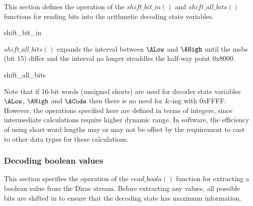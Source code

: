\label{arithshiftin}

This section defines the operation of the $shift\_bit\_in()$ 
and $shift\_all\_bits()$ functions
for reading bits into the arithmetic decoding state variables.

\begin{pseudo}{shift\_bit\_in}{}
\end{pseudo}

$shift\_all\_bits()$ expands the interval between $\ALow$ and $\AHigh$
until the msbs (bit 15) differ and the interval no longer
straddles the half-way point 0x8000.

\begin{pseudo}{shift\_all\_bits}{}
\bsEND
{}
\bsEND
\end{pseudo}

\begin{informative}
Note that if 16-bit words (unsigned shorts) are used for decoder state variables $\ALow$,
 $\AHigh$ and $\ACode$ then there is no need for {\&}-ing with 0xFFFF. However, the 
operations specified here are defined in terms of integers, since intermediate calculations
 require higher dynamic range. In software, the efficiency of using short word lengths may
or may not be offset by the requirement to cast to other data types for these calculations.
\end{informative}

\subsubsection{Decoding boolean values}

\label{arithreadbool}

This section specifies the operation of the $read\_boola()$ function
for extracting a boolean value from the Dirac stream. Before extracting
any values, all possible bits are shifted in to ensure that the decoding
state has maximum information.

